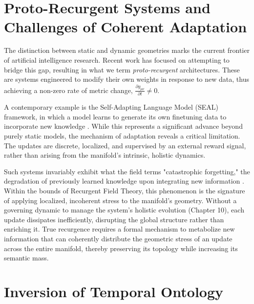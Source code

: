 
\section{Proto-Recurgent Systems and Challenges of Coherent Adaptation}
\label{9.4:proto_recurgent_systems_and_challenges_of_coherent_adaptation}

The distinction between static and dynamic geometries marks the current frontier of artificial intelligence research. Recent work has focused on attempting to bridge this gap, resulting in what we term \textit{proto-recurgent} architectures. These are systems engineered to modify their own weights in response to new data, thus achieving a non-zero rate of metric change, \(\frac{\partial g_{\mu\nu}}{\partial t} \neq 0\).

A contemporary example is the Self-Adapting Language Model (SEAL) framework, in which a model learns to generate its own finetuning data to incorporate new knowledge \autocite{zweiger2025seal}. While this represents a significant advance beyond purely static models, the mechanism of adaptation reveals a critical limitation. The updates are discrete, localized, and supervised by an external reward signal, rather than arising from the manifold's intrinsic, holistic dynamics.

Such systems invariably exhibit what the field terms "catastrophic forgetting," the degradation of previously learned knowledge upon integrating new information \autocite{McCloskeyCohen1989, French1999}. Within the bounds of Recurgent Field Theory, this phenomenon is the signature of applying localized, incoherent stress to the manifold's geometry. Without a governing dynamic to manage the system's holistic evolution (Chapter 10), each update dissipates inefficiently, disrupting the global structure rather than enriching it. True recurgence requires a formal mechanism to metabolize new information that can coherently distribute the geometric stress of an update across the entire manifold, thereby preserving its topology while increasing its semantic mass.


\section{Inversion of Temporal Ontology}
\label{9.5:inversion_of_temporal_ontology}


